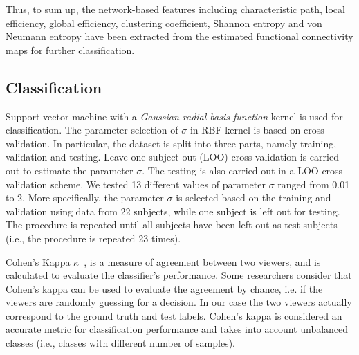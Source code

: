 Thus, to sum up, the network-based features including characteristic path, local efficiency, global efficiency, clustering coefficient, Shannon entropy and von Neumann entropy have been extracted from the estimated functional connectivity maps for further classification. 

\subsection{Classification}

Support vector machine with a \emph{Gaussian radial basis function} kernel is used for classification. The parameter selection of $\sigma$ in RBF kernel is based on cross-validation. In particular, the dataset is split into three parts, namely training, validation and testing. Leave-one-subject-out (LOO) cross-validation is carried out to estimate the parameter $\sigma$. The testing is also carried out in a LOO cross-validation scheme. We tested 13 different values of parameter $\sigma$ ranged from 0.01 to 2. More specifically, the parameter $\sigma$ is selected based on the training and validation using data from 22 subjects, while one subject is left out for testing. The procedure is repeated until all subjects have been left out as test-subjects (i.e., the procedure is repeated 23 times). 

Cohen's Kappa $\kappa$~\cite{uebersax1987diversity}, is a measure of agreement between two viewers, and is calculated to evaluate the classifier's performance. Some researchers consider that Cohen's kappa can be used to evaluate the agreement by chance, i.e. if the viewers are randomly guessing for a decision. In our case the two viewers actually correspond to the ground truth and test labels. Cohen's kappa is considered an accurate metric for classification performance and takes into account unbalanced classes (i.e., classes with different number of samples). 
